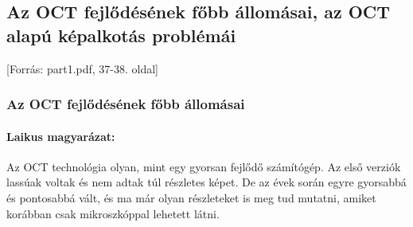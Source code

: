 \documentclass[a4paper,12pt]{article}
\begin{document}
\subsection{Az OCT fejlődésének főbb állomásai, az OCT alapú képalkotás problémái} [Forrás: part1.pdf, 37-38. oldal]

\subsubsection{Az OCT fejlődésének főbb állomásai}

\paragraph{Laikus magyarázat:} Az OCT technológia olyan, mint egy gyorsan fejlődő számítógép. Az első verziók lassúak voltak és nem adtak túl részletes képet. De az évek során egyre gyorsabbá és pontosabbá vált, és ma már olyan részleteket is meg tud mutatni, amiket korábban csak mikroszkóppal lehetett látni.
\end{document}
